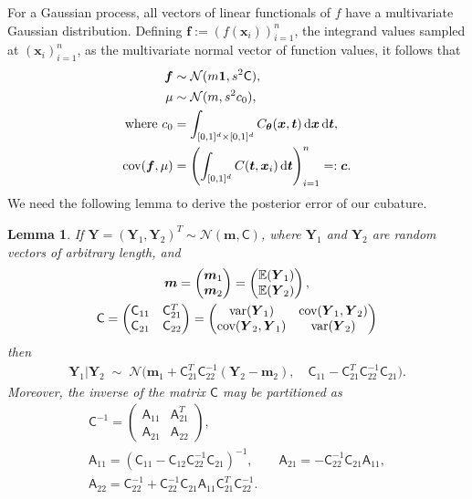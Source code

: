 \documentclass{iitthesis}          %
\newcommand{\bm}[1]{\boldsymbol{#1}}
\newcommand{\dif}[1]{\text{d}{#1}}
\newcommand{\D}[1]{\text{d}{#1}}
\newcommand{\Ex}{\mathbb{E}}
\newcommand{\vtheta}{{\bm{\theta}}}
\newcommand{\vc}{\bm{c}}
\newcommand{\vf}{\bm{f}}
\newcommand{\vm}{\bm{m}}
\newcommand{\vt}{\bm{t}}
\newcommand{\vx}{\bm{x}}
\newcommand{\vY}{\bm{Y}}
\newcommand{\vone}{\bm{1}}
\newcommand{\mA}{\mathsf{A}}
\newcommand{\mC}{\mathsf{C}}
\newcommand{\cov}{{\textup{cov}}}
\newcommand{\var}{{\textup{var}}}
\newcommand{\calN}{\mathcal{N}}
\newtheorem{lemma}[theorem]{Lemma}
\begin{document}
For a Gaussian process, all vectors of linear functionals of $f$ have a multivariate Gaussian distribution. Defining  $\vf  := \left( f(\vx_i)\right)_{i=1}^n$, the integrand values sampled at $\left( \vx_i\right)_{i=1}^n$,  as the multivariate normal vector of function values, it follows that 
\begin{subequations} \label{eqn:fGaussDist}
\begin{align}
\vf  & \sim \calN(m \vone, s^2 \mC), \\
\mu & \sim \calN(m, s^2 c_0), 
\\
\text{where }
c_0 &= \int_{[0,1]^{d} \times [0,1]^{d}} C_\vtheta(\vx,\vt) \, \dif{\vx} \, \dif{\vt}, \\
\cov(\vf, \mu) &= \left(  \int_{[0,1]^d} C(\vt,\vx_i) \, \D \vt \right)_{i=1}^n  =: \vc.
\end{align}
\end{subequations}
We need the following lemma to derive the posterior error of our cubature. 

\begin{lemma} \cite[(A.6), (A.11--13)]{RasWil06a} \label{thrm:condDist} If $\vY = (\vY_1, \vY_2)^T \sim \calN (\vm,\mC)$, where $\vY_1$ and $\vY_2$ are random vectors of arbitrary length, and 
	\begin{gather*}
	\vm = \begin{pmatrix} \vm_1 \\ \vm_2 \end{pmatrix} = \begin{pmatrix} \Ex(\vY_1) \\ \Ex(\vY_2) \end{pmatrix}, \\
	\mC = \begin{pmatrix}
	\mC_{11} & \mC_{21}^T \\ 	\mC_{21} & \mC_{22}
	\end{pmatrix} =
	\begin{pmatrix}
	\var(\vY_{1}) & \cov(\vY_{1}, \vY_2) \\ 	\cov(\vY_2,\vY_{1}) & \var(\vY_{2})
	\end{pmatrix} 
	\end{gather*}
	then 
	\begin{align*}
	\vY_1 \vert \vY_2 \; \sim \; \calN \bigl(\vm_1 + \mC_{21}^T \mC_{22}^{-1}(\vY_2 - \vm_2), \quad \mC_{11} - \mC_{21}^T \mC_{22}^{-1} \mC_{21} \bigr).
	\end{align*}
Moreover, the inverse of the matrix $\mC$ may be partitioned as
\begin{gather*}
\mC^{-1} = \begin{pmatrix} \mA_{11} & \mA_{21}^T \\ \mA_{21} & \mA_{22} \end{pmatrix}, \\
\mA_{11} = (\mC_{11} - \mC_{12} \mC_{22}^{-1} \mC_{21})^{-1}, \qquad 
\mA_{21} = -  \mC_{22}^{-1} \mC_{21} \mA_{11}, \\ 
\mA_{22} = \mC_{22}^{-1} + \mC_{22}^{-1} \mC_{21} \mA_{11} \mC_{21}^T \mC_{22}^{-1}.
\end{gather*}
\end{lemma}
\end{document}
